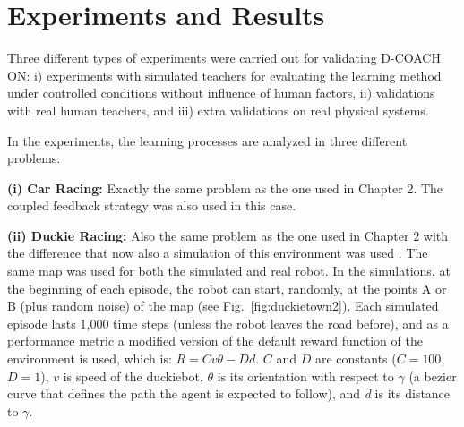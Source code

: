 \section{Experiments and Results}

Three different types of experiments were carried out for validating D-COACH ON: i) experiments with simulated teachers for evaluating the learning method under controlled conditions without influence of human factors, ii) validations with real human teachers, and iii) extra validations on real physical systems.

In the experiments, the learning processes are analyzed in three different problems:

\textbf{(i) Car Racing:} Exactly the same problem as the one used in Chapter 2. The coupled feedback strategy was also used in this case. 
    
\textbf{(ii) Duckie Racing:} Also the same problem as the one used in Chapter 2 with the difference that now also a simulation of this environment was used \cite{gym_duckietown}. The same map was used for both the simulated and real robot. In the simulations, at the beginning of each episode, the robot can start, randomly, at the points A or B (plus random noise) of the map (see Fig.~\ref{fig:duckietown2}). Each simulated episode lasts 1,000 time steps (unless the robot leaves the road before), and as a performance metric a modified version of the default reward function of the environment is used, which is: $R = Cv\theta - Dd$. $C$ and $D$ are constants ($C=100$, $D=1$), $v$ is speed of the duckiebot, $\theta$ is its orientation with respect to $\gamma$ (a bezier curve that defines the path the agent is expected to follow), and \emph{d} is its distance to $\gamma$.

